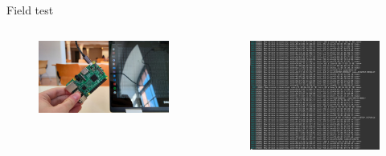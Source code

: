 \documentclass{beamer}
\begin{document}
\begin{frame}{Field test}
	\begin{columns}
		\begin{column}{0.5\textwidth}
			\begin{figure}
				\centering
				\includegraphics[width=1\textwidth]{images/RpiBiblioPhoto.jpg}
			\end{figure}
		\end{column}
		\begin{column}{0.5\textwidth}
			\begin{figure}
				\centering
				\includegraphics[width=1\textwidth]{images/ScanningScreen.png}
			\end{figure}
		\end{column}
	\end{columns}


\end{frame}
\end{document}
